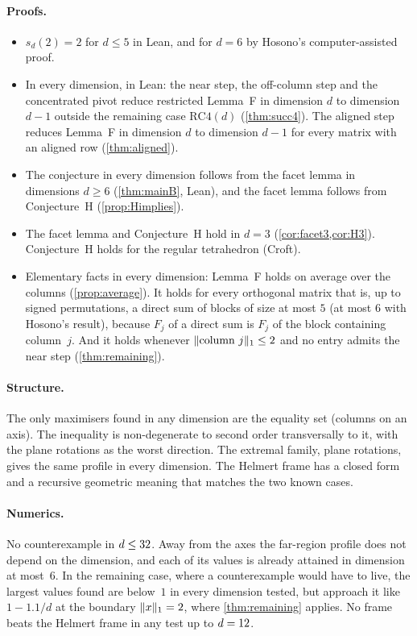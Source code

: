 \documentclass[11pt,a4paper]{article}
\begin{document}
\paragraph{Proofs.}
\begin{itemize}
\item $s_d(2)=2$ for $d\le5$ in Lean, and for $d=6$ by Hosono's computer-assisted proof.
\item In every dimension, in Lean: the near step, the off-column step and the concentrated pivot reduce restricted Lemma~F in dimension $d$ to dimension $d-1$ outside the remaining case $\mathrm{RC4}(d)$ (\cref{thm:succ4}). The aligned step reduces Lemma~F in dimension $d$ to dimension $d-1$ for every matrix with an aligned row (\cref{thm:aligned}).
\item The conjecture in every dimension follows from the facet lemma in dimensions $d\ge6$ (\cref{thm:mainB}, Lean), and the facet lemma follows from Conjecture~H (\cref{prop:Himplies}).
\item The facet lemma and Conjecture~H hold in $d=3$ (\cref{cor:facet3,cor:H3}). Conjecture~H holds for the regular tetrahedron (Croft).
\item Elementary facts in every dimension: Lemma~F holds on average over the columns (\cref{prop:average}). It holds for every orthogonal matrix that is, up to signed permutations, a direct sum of blocks of size at most $5$ (at most $6$ with Hosono's result), because $F_j$ of a direct sum is $F_j$ of the block containing column~$j$. And it holds whenever $\lVert \text{column }j\rVert_1\le2$ and no entry admits the near step (\cref{thm:remaining}).
\end{itemize}

\paragraph{Structure.} The only maximisers found in any dimension are the equality set (columns on an axis). The inequality is non-degenerate to second order transversally to it, with the plane rotations as the worst direction. The extremal family, plane rotations, gives the same profile in every dimension. The Helmert frame has a closed form and a recursive geometric meaning that matches the two known cases.

\paragraph{Numerics.} No counterexample in $d\le32$. Away from the axes the far-region profile does not depend on the dimension, and each of its values is already attained in dimension at most~$6$. In the remaining case, where a counterexample would have to live, the largest values found are below~$1$ in every dimension tested, but approach it like $1-1.1/d$ at the boundary $\lVert x\rVert_1=2$, where \cref{thm:remaining} applies. No frame beats the Helmert frame in any test up to $d=12$.
\end{document}
